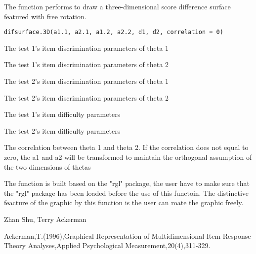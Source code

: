 \begin{Description}\relax
The function performs to draw a three-dimensional score difference surface featured with free rotation.
\end{Description}
\begin{Usage}
\begin{verbatim}
difsurface.3D(a1.1, a2.1, a1.2, a2.2, d1, d2, correlation = 0)
\end{verbatim}
\end{Usage}
\begin{Arguments}
\begin{ldescription}
\item[\code{a1.1}] The test 1's item discrimination parameters of theta 1 
\item[\code{a2.1}] The test 1's item discrimination parameters of theta 2 
\item[\code{a1.2}] The test 2's item discrimination parameters of theta 1 
\item[\code{a2.2}] The test 2's item discrimination parameters of theta 2 
\item[\code{d1}] The test 1's item difficulty parameters
\item[\code{d2}] The test 2's item difficulty parameters
\item[\code{correlation}] The correlation between theta 1 and theta 2. If the correlation does not equal to zero, the a1 and a2 will be transformed to maintain the orthogonal assumption of the two dimensions of thetas 
\end{ldescription}
\end{Arguments}
\begin{Details}\relax
The function is built based on the "rgl" package, the user have to make sure that the "rgl" package has been loaded before the use of this functoin. 
The distinctive feacture of the graphic by this function is the user can roate the graphic freely.
\end{Details}
\begin{Author}\relax
Zhan Shu, Terry Ackerman
\end{Author}
\begin{References}\relax
Ackerman,T.(1996),Graphical Representation of Multidimensional Item Response Theory Analyses,Applied Psychological Measurement,20(4),311-329.
\end{References}
